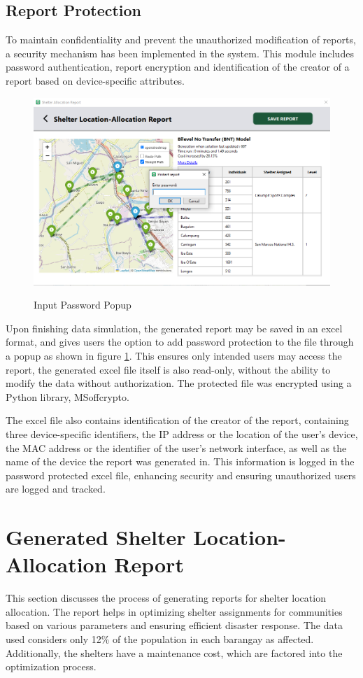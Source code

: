 \subsection{Report Protection}
	To maintain confidentiality and prevent the unauthorized modification of reports, a security mechanism has been implemented in the system. This module includes password authentication, report encryption and identification of the creator of a report based on device-specific attributes.
	
	\begin{figure}[h!]
		\caption{Input Password Popup}
		\centering
		\includegraphics[width=4.5in]{Chapter 4/alloc report pass}
		\label{passPop}
	\end{figure}
	Upon finishing data simulation, the generated report may be saved in an excel format, and gives users the option to add password protection to the file through a popup as shown in figure \ref{passPop}. This ensures only intended users may access the report, the generated excel file itself is also read-only, without the ability to modify the data without authorization. The protected file was encrypted using a Python library, MSoffcrypto.
	
	The excel file also contains identification of the creator of the report, containing three device-specific identifiers, the IP address or the location of the user’s device, the MAC address or the identifier of the user’s network interface, as well as the name of the device the report was generated in. This information is logged in the password protected excel file, enhancing security and ensuring unauthorized users are logged and tracked. 
	
\section{Generated Shelter Location-Allocation Report}
	This section discusses the process of generating reports for shelter location allocation. The report helps in optimizing shelter assignments for communities based on various parameters and ensuring efficient disaster response. The data used considers only 12\% of the population in each barangay as affected. Additionally, the shelters have a maintenance cost, which are factored into the optimization process.
	
